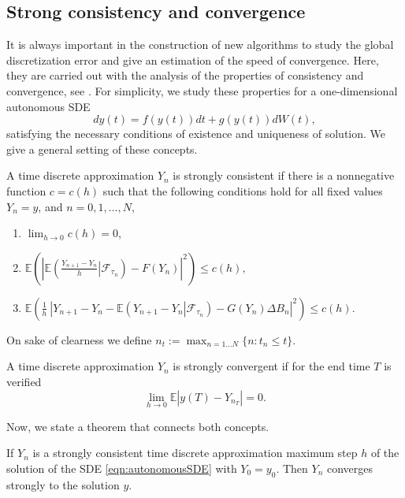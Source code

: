 \subsection{Strong consistency and convergence}\label{sec3}
		It is always important in the construction of  new algorithms to study  the global
	discretization error and give an estimation of the speed of convergence. Here, they are
	carried out with  the analysis of the properties of consistency and convergence, see
	\cite{Kloeden1992}. For simplicity, we study these properties for a
	one-dimensional autonomous SDE
	\begin{equation}\label{eqn:autonomousSDE}
		dy(t) = f(y(t))dt+g(y(t))dW(t),
	\end{equation}
	satisfying the necessary conditions of existence and uniqueness of solution.  We
	give a general setting of these concepts.
	\begin{dfn}\label{dfn:Consistency}
	A time discrete approximation $Y_n$ is strongly consistent if there is a nonnegative
	function $c=c(h)$ such that the following conditions hold for all fixed values $Y_n=y$,
	and $n=0,1,\dots, N$,
	\begin{enumerate}%
		\item \label{eqn:DefConsitenceA}
	$\displaystyle \lim_{h\rightarrow 0} c(h)=0$,
		\item\label{eqn:DefConsitenceB}
	$\displaystyle \mathbb{E} \left(\left| \mathbb{E} \left(
			\frac{Y_{n+1}-Y_n}{h} \left|\mathcal{F}_{\tau_n}\right.
		\right)-F\left( Y_n \right)\right|^2 \right)\leq c(h),$
		\item \label{eqn:DefConsitenceC}
	$ \displaystyle  \mathbb{E} \left(\frac{1}{h} \
	\left|Y_{n+1}-Y_n-\mathbb{E}\left(Y_{n+1}-Y_n
	\left| \mathcal{F}_{\tau_n}\right.\right)-G\left(Y_n\right)
	\Delta B_n\right|^2 \right) \leq c(h)$.
	\end{enumerate}
	\end{dfn}
	On sake of clearness we define
	$\displaystyle n_t:= \max_{n=1 \ldots N}\{n: t_n\leq t\}$.
	\begin{dfn}
	A time discrete approximation $Y_n$ is strongly convergent  if for the end time $T$ is
	verified
	\begin{equation*}
		\lim_{h \rightarrow 0}
		\mathbb{E}\left| y(T)-Y_{n_T}\right|=0.
	\end{equation*}
	\end{dfn}
Now, we state a theorem that connects both concepts.
\begin{thm}\label{thm:ConsistencyConvergence}
	If $Y_n$ is a strongly consistent time discrete approximation maximum step $h$ of the
	solution  of the SDE \eqref{eqn:autonomousSDE} with $Y_0=y_0$. Then $Y_n$ converges
	strongly to the solution $y$.
\end{thm} 

